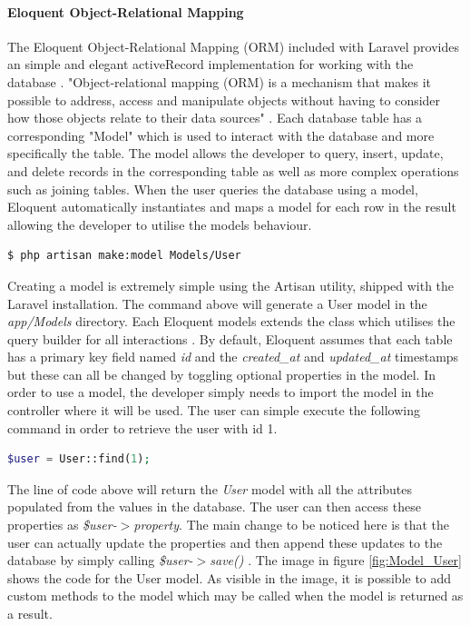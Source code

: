 \paragraph{Eloquent Object-Relational Mapping}
The Eloquent Object-Relational Mapping (ORM) included with Laravel provides an simple and elegant activeRecord implementation for working with the database \cite{Laravel:Eloquent}. "Object-relational mapping (ORM) is a mechanism that makes it possible to address, access and manipulate objects without having to consider how those objects relate to their data sources" \cite{TechTarget:ORM}. Each database table has a corresponding "Model" which is used to interact with the database and more specifically the table. The model allows the developer to query, insert, update, and delete records in the corresponding table as well as more complex operations such as joining tables. When the user queries the database using a model, Eloquent automatically instantiates and maps a model for each row in the result allowing the developer to utilise the models behaviour.

\begin{lstlisting}[language=bash]
	$ php artisan make:model Models/User
\end{lstlisting}

Creating a model is extremely simple using the Artisan utility, shipped with the Laravel installation. The command above will generate a User model in the \emph{app/Models} directory. Each Eloquent models extends the  class which utilises the query builder for all interactions \cite{Laravel:Eloquent}. By default, Eloquent assumes that each table has a primary key field named \emph{id} and the \emph{created\_at} and \emph{updated\_at} timestamps but these can all be changed by toggling optional properties in the model. In order to use a model, the developer simply needs to import the model in the controller where it will be used. The user can simple execute the following command in order to retrieve the user with id 1.

\begin{lstlisting}[language=php]
	$user = User::find(1);
\end{lstlisting}

The line of code above will return the \emph{User} model with all the attributes populated from the values in the database. The user can then access these properties as \emph{\$user-$>$property}. The main change to be noticed here is that the user can actually update the properties and then append these updates to the database by simply calling \emph{\$user-$>$save()} \cite{Laravel:Eloquent}.  The image in figure \ref{fig:Model_User} shows the code for the User model. As visible in the image, it is possible to add custom methods to the model which may be called when the model is returned as a result.

